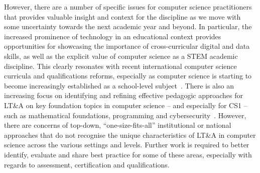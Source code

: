 \documentclass[conference]{IEEEtran}
\begin{document}
However, there are a number of specific issues for computer science
practitioners that provides valuable insight and context for the
discipline as we move with some uncertainty towards the next academic
year and beyond. In particular, the increased prominence of technology
in an educational context provides opportunities for showcasing the
importance of cross-curricular digital and data skills, as well as the
explicit value of computer science as a STEM academic discipline. This
clearly resonates with recent international computer science curricula
and qualifications reforms, especially as computer science is starting
to become increasingly established as a school-level
subject~\cite{bell:2014,brown-et-al-toce2014,gal-ezer+stephenson:2014,raman-et-al:2015}.
There is also an increasing focus on identifying and refining
effective pedagogic approaches for LT\&A on key foundation topics in
computer science -- and especially for CS1 -- such as mathematical
foundations, programming and
cybersecurity~\cite{davenport-et-al:latice2016,murphy-et-al:programming2017,simon-et-al:sigcse2018,crick-et-al:fie2019,davenport+crick:fmfun2019,prickett-et-al:iticse2020,crick-et-al:fie2020}. However,
there are concerns of top-down, ``one-size-fits-all'' institutional or
national approaches that do not recognise the unique characteristics
of LT\&A in computer science across the various settings and
levels. Further work is required to better identify, evaluate and
share best practice for some of these areas, especially with regards
to assessment, certification and qualifications.

\end{document}
